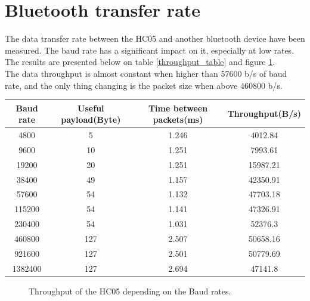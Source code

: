 \documentclass[11pt]{article}
\begin{document}
\section{Bluetooth transfer rate}
The data transfer rate between the HC05 and another bluetooth device have been measured. The baud rate has a significant impact on it, especially at low rates. The results are presented below on table \ref{throughput_table} and figure \ref{throughput_fig}.\\
The data throughput is almost constant when higher than 57600 b/s of baud rate, and the only thing changing is the packet size when above 460800 b/s.
\begin{center}
\label{throughput_table}
\begin{tabular}{|c|c|c|c|}
\hline
Baud rate & Useful payload(Byte) & Time between packets(ms) & Throughput(B/s)\\
\hline
4800 & 5 & 1.246 & 4012.84 \\
\hline
9600 & 10 & 1.251 & 7993.61 \\
\hline
19200 & 20 & 1.251 & 15987.21 \\
\hline
38400 & 49 & 1.157 & 42350.91 \\
\hline
57600 & 54 & 1.132 & 47703.18 \\
\hline
115200 & 54 & 1.141 & 47326.91 \\
\hline
230400 & 54 & 1.031 & 52376.3 \\
\hline
460800 & 127 & 2.507 & 50658.16 \\
\hline
921600 & 127 & 2.501 & 50779.69 \\
\hline
1382400 & 127 & 2.694 & 47141.8\\
\hline
\end{tabular}
\end{center}
\begin{figure}[H]
\center
{}
\caption{Throughput of the HC05 depending on the Baud rates.}
\label{throughput_fig}
\end{figure}
\end{document}
